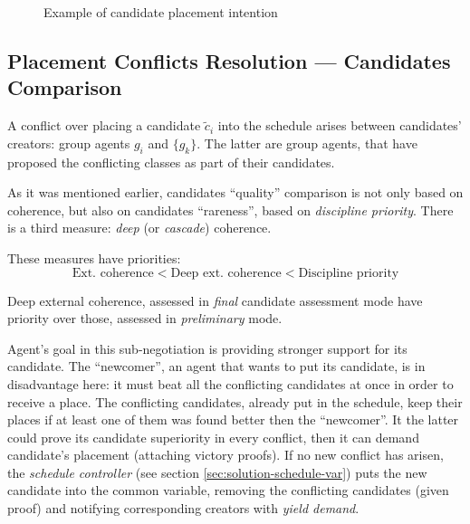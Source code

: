 \documentclass[../../header]{subfiles}
\begin{document}

\begin{figure}[H]
  \centering
  
  \caption{ Example of candidate placement intention }
  \label{fig:candidate-conflict}
\end{figure}


\subsection{Placement Conflicts Resolution --- Candidates Comparison}
\label{sec:solution-compare}

A conflict over placing a candidate $\tilde{c}_i$ into the schedule arises
between candidates' creators: group agents $g_i$ and $\{g_k\}$.
The latter are group agents, that have proposed the conflicting classes
as part of their candidates.

As it was mentioned earlier, candidates ``quality'' comparison is not only based
on coherence, but also on candidates ``rareness'', based on \emph{discipline priority}.
There is a third measure: \emph{deep} (or \emph{cascade}) coherence.

\medskip
\noindent
These measures have priorities:
$$ \text{Ext. coherence} < \text{Deep ext. coherence} < \text{Discipline priority} $$

\medskip
\noindent
Deep external coherence, assessed in \emph{final} candidate assessment mode
have priority over those, assessed in \emph{preliminary} mode.

\bigskip
\noindent
Agent's goal in this sub-negotiation is providing stronger support for its
candidate. The ``newcomer'', an agent that wants to put its candidate, is
in disadvantage here: it must beat all the conflicting candidates at once in
order to receive a place. The conflicting candidates, already put in the schedule,
keep their places if at least one of them was found better then the ``newcomer''.
It the latter could prove its candidate superiority in every conflict, then
it can demand candidate's placement (attaching victory proofs).
If no new conflict has arisen, the \emph{schedule controller}
(see section \ref{sec:solution-schedule-var}) puts the new candidate into the
common variable, removing the conflicting candidates (given proof) and notifying
corresponding creators with \emph{yield demand}.
\end{document}
